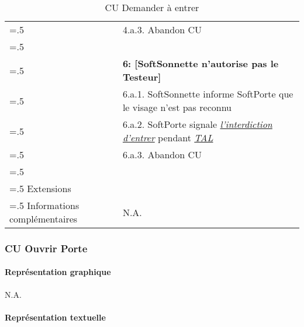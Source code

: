 \begin{table}[H]
\begin{tabularx}{\textwidth}{|>{\hsize=.5\hsize}X|>{\hsize=1.5\hsize}X|}
    & 4.a.3. Abandon CU \\
    & \\
    & \textbf{6: [SoftSonnette n'autorise pas le Testeur]} \\
    & 6.a.1. SoftSonnette informe SoftPorte que le visage n'est pas reconnu \\
    & 6.a.2. SoftPorte signale \hyperlink{EcranSoftPorte}{\textit{l'interdiction d'entrer}} pendant \hyperlink{tal}{\textit{TAL}} \\
    & 6.a.3. Abandon CU \\
    & \\
    \hline
    Extensions & \\
    \hline
    Informations complémentaires & N.A. \\
    \hline
  \end{tabularx}
  \caption{CU Demander à entrer}
  \label{tableau-cu-entrer}
\end{table}

\newpage

\subsubsection{CU Ouvrir Porte}

\paragraph{Représentation graphique}

N.A.

\paragraph{Représentation textuelle}
\hypertarget{CU_ouvrePorte}{}

